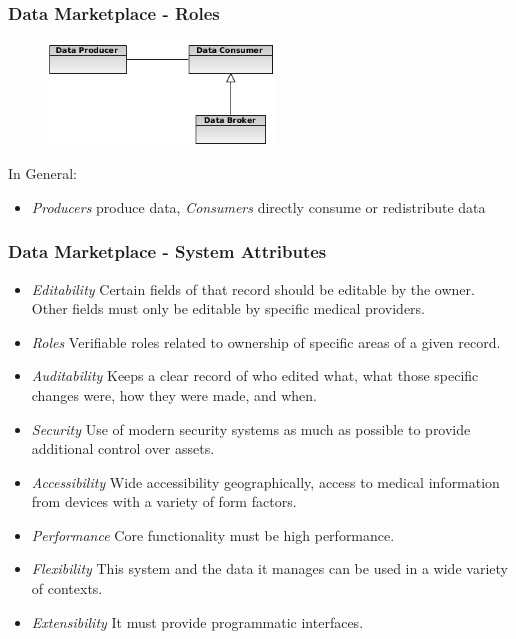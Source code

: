 \documentclass[t, 10pt]{beamer}
\begin{document}
\begin{frame}
\frametitle{Data Marketplace - Roles}

\begin{figure}
\includegraphics[width = 6cm]{roles}
\end{figure}
\pause

In General:
\begin{itemize}
\item \textit{Producers} produce data, \textit{Consumers} directly consume or redistribute data
\end{itemize}

\end{frame}

\begin{frame}
\frametitle{Data Marketplace - System Attributes}

\begin{itemize}

\item \textit{Editability} Certain fields of that record should be editable by the owner.  Other fields must only be editable by specific medical providers.

\item \textit{Roles} Verifiable roles related to ownership of specific areas of a given record.

\item \textit{Auditability} Keeps a clear record of who edited what, what those specific changes were, how they were made, and when. 

\item \textit{Security} Use of modern security systems as much as possible to provide additional control over assets. 

\item \textit{Accessibility} Wide accessibility geographically, access to medical information from devices with a variety of form factors.

\item \textit{Performance} Core functionality must be high performance.

\item \textit{Flexibility} This system and the data it manages can be used in a wide variety of contexts.

\item \textit{Extensibility} It must provide programmatic interfaces.

\end{itemize}

\end{frame}
\end{document}
